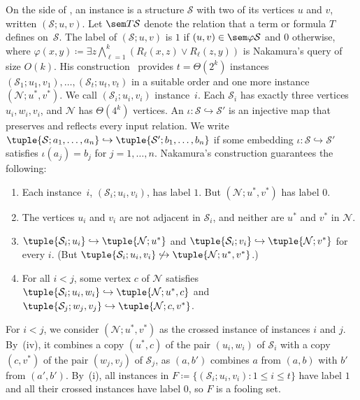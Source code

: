 On the side of \FOthree, an instance is a structure $\mathcal S$ with two of its vertices $u$ and $v$, 
written $(\mathcal S;u,v)$.
Let $\sem T{\mathcal S}$ denote the relation that a term or formula $T$ defines on~$\mathcal S$.
The label of $(\mathcal S;u,v)$ is $1$
if $(u,v)\in\sem\varphi{\mathcal S}$ and $0$ otherwise, where
$\varphi(x,y) \coloneqq
\exists z\bigwedge_{\ell=1}^k(R_\ell(x,z)\lor R_\ell(z,y))$
is Nakamura's query of size $O(k)$.
His construction~\citep[\S5]{nakamura2022} provides $t=\Theta(2^k)$ instances
$(\mathcal S_1;u_1,v_1),\ldots,(\mathcal S_t;u_t,v_t)$
in a suitable order
and one more instance $(\mathcal N;u^*,v^*)$.
We call $(\mathcal S_i;u_i,v_i)$ instance~$i$.
Each $\mathcal S_i$ has exactly three vertices $u_i,w_i,v_i$,
and $\mathcal N$ has $\Theta(4^k)$ vertices.
%
An 
$\iota\colon\mathcal S\hookrightarrow\mathcal S'$
is an injective map that preserves and reflects every input relation.
%
We write
$\tuple{\mathcal S; a_1,\ldots,a_n}
\hookrightarrow
\tuple{\mathcal S'; b_1,\ldots,b_n}$
if some embedding $\iota\colon\mathcal S\hookrightarrow\mathcal S'$ satisfies $\iota(a_j)=b_j$ for $j=1,\ldots,n$.
%
Nakamura's construction guarantees the following:
\begin{enumerate}[label=(\roman*),leftmargin=*]
\item Each instance~$i$, $(\mathcal S_i; u_i, v_i)$, has label $1$. But $(\mathcal N;u^*,v^*)$ has label $0$.
%
\item The vertices $u_i$ and $v_i$ are not adjacent in $\mathcal S_i$, and
  neither are $u^*$ and $v^*$ in $\mathcal N$.
%
\item $\tuple{\mathcal S_i;u_i}
\hookrightarrow
\tuple{\mathcal N; u^*}$ and
$\tuple{\mathcal S_i; v_i}\hookrightarrow
\tuple{\mathcal N; v^*}$ for every $i$.
(But $\tuple{\mathcal S_i; u_i, v_i}
\not\hookrightarrow
\tuple{\mathcal N; u^*, v^*}$.)
%  
\item For all $i<j$, some vertex $c$ of $\mathcal N$ satisfies
  $\tuple{\mathcal S_i; u_i,w_i}\hookrightarrow
  \tuple{\mathcal N; u^*,c}$ and
  $\tuple{\mathcal S_j; w_j,v_j}\hookrightarrow
  \tuple{\mathcal N; c,v^*}$.
\end{enumerate}
For $i<j$, we consider $(\mathcal N;u^*,v^*)$ as the crossed instance of instances $i$ and $j$.
By~(iv), it combines a copy $(u^*,c)$ of the pair $(u_i,w_i)$ of $\mathcal S_i$
with a copy $(c,v^*)$ of the pair $(w_j,v_j)$ of $\mathcal S_j$,
as $(a,b')$ combines $a$ from $(a,b)$ with $b'$ from $(a',b')$.
By~(i), all instances in
$F\coloneqq\{(\mathcal S_i;u_i,v_i):1\le i\le t\}$
have label $1$ and all their crossed instances have label $0$, so $F$ is a fooling set.


